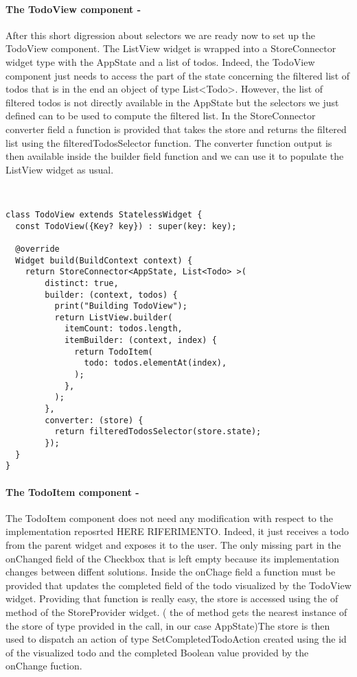 \paragraph{The TodoView component - }
\label{subpar:todo_app_bloc_core_state}
After this short digression about selectors we are ready now to set up the TodoView component. The ListView widget is wrapped into a StoreConnector widget type with the AppState and a list of todos. Indeed, the TodoView component just needs to access the part of the state concerning the filtered list of todos that is in the end an object of type List<Todo>. However, the list of filtered todos is not directly available in the AppState but the selectors we just defined can to be used to compute the filtered list. In the StoreConnector converter field a function is provided that takes the store and returns the filtered list using the filteredTodosSelector function. The converter function output is then available inside the builder field function and we can use it to populate the ListView widget as usual. 
\begin{code}
\mbox{}\\
 \mbox{}
		\label{code:2.14}
\begin{verbatim}
class TodoView extends StatelessWidget {
  const TodoView({Key? key}) : super(key: key);

  @override
  Widget build(BuildContext context) {
    return StoreConnector<AppState, List<Todo> >(
        distinct: true,
        builder: (context, todos) {
          print("Building TodoView");
          return ListView.builder(
            itemCount: todos.length,
            itemBuilder: (context, index) {
              return TodoItem(
                todo: todos.elementAt(index),
              );
            },
          );
        },
        converter: (store) {
          return filteredTodosSelector(store.state);
        });
  }
}
\end{verbatim}
\mbox{}
\end{code}

\paragraph{The TodoItem component - }
\label{subpar:todo_app_bloc_core_state}

The TodoItem component does not need any modification with respect to the implementation reposrted HERE RIFERIMENTO. Indeed, it just receives a todo from the parent widget and exposes it to the user. The only missing part in the onChanged field of the Checkbox that is left empty because its implementation changes between diffent solutions. Inside the onChage field a function must be provided that updates the completed field of the todo visualized by the TodoView widget. Providing that function is really easy, the store is accessed using the of method of the StoreProvider widget. ( the of method gets the nearest instance of the store of type provided in the call, in our case AppState)The store is then used to dispatch an action of type SetCompletedTodoAction created using the id of the visualized todo and the completed Boolean value provided by the onChange fuction.

